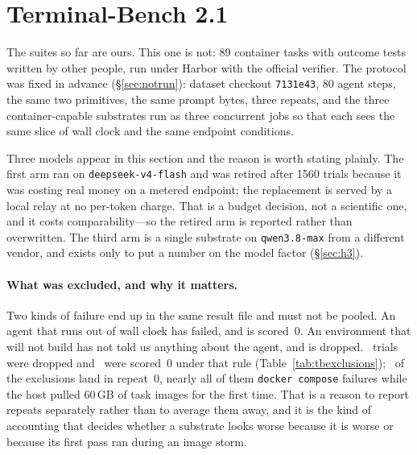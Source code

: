 \documentclass[11pt,a4paper]{article}
\newcommand{\widetable}[1]{\resizebox{\textwidth}{!}{}}
\begin{document}
\section{Terminal-Bench 2.1}
\label{sec:tb}

The suites so far are ours. This one is not: 89 container tasks with outcome
tests written by other people, run under Harbor with the official verifier.
The protocol was fixed in advance (\S\ref{sec:notrun}): dataset checkout
\texttt{7131e43}, 80 agent steps, the same two primitives, the same prompt
bytes, three repeats, and the three container-capable substrates run as three
concurrent jobs so that each sees the same slice of wall clock and the same
endpoint conditions.

Three models appear in this section and the reason is worth stating plainly.
The first arm ran on \texttt{deepseek-v4-flash} and was retired after 1560
trials because it was costing real money on a metered endpoint; the replacement
is served by a local relay at no per-token charge. That is a budget decision,
not a scientific one, and it costs comparability---so the retired arm is
reported rather than overwritten. The third arm is a single substrate on
\texttt{qwen3.8-max} from a different vendor, and exists only to put a number
on the model factor (\S\ref{sec:h3}).

\begin{table}[h]\centering\small
\caption{The arms. Protocols belong to the adapter, never to the kernel:
\texttt{a} forbids commentary, \texttt{b} requires a thought before the action,
\texttt{br} is \texttt{b} with an output budget wide enough for a model that
reasons before it answers.}
\label{tab:tbarms}
\widetable{gen/tab-tb-arms}
\end{table}

\begin{table}[h]\centering\small
\caption{\tbtrials\ trials: \tbtasks\ tasks $\times$ 3 substrates $\times$
\tbreps\ repeats. Rates are over scored trials.}
\label{tab:tb}

\end{table}

\paragraph{What was excluded, and why it matters.}
Two kinds of failure end up in the same result file and must not be pooled.
An agent that runs out of wall clock has failed, and is scored~0. An
environment that will not build has not told us anything about the agent, and
is dropped. \tbexcluded\ trials were dropped and \tbagentfault\ were scored~0
under that rule (Table~\ref{tab:tbexclusions}); \tbexcludedfirstrep\ of the
exclusions land in repeat~0, nearly all of them \texttt{docker compose}
failures while the host pulled 60\,GB of task images for the first time. That
is a reason to report repeats separately rather than to average them away, and
it is the kind of accounting that decides whether a substrate looks worse
because it is worse or because its first pass ran during an image storm.
\end{document}
